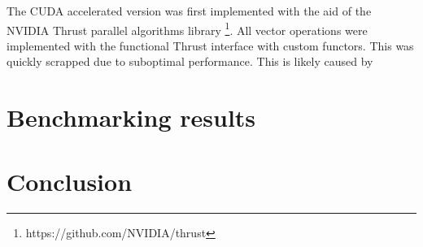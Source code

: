 \documentclass{article}
\begin{document}
The CUDA accelerated version was first implemented with the aid of the
NVIDIA Thrust parallel algorithms library \footnote{https://github.com/NVIDIA/thrust}.
All vector operations were implemented with the functional Thrust interface with custom
functors.
This was quickly scrapped due to suboptimal performance. This is likely caused
by

\section{Benchmarking results}


\section{Conclusion}

 

\end{document}
